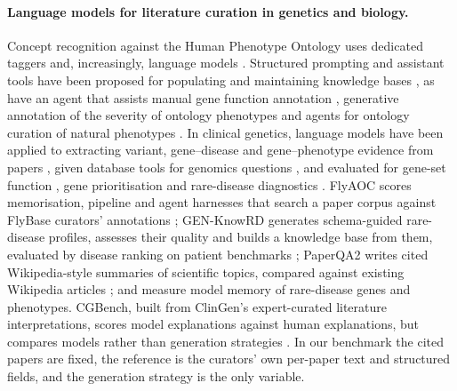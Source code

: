 \documentclass{article} %
\begin{document}
\paragraph{Language models for literature curation in genetics and biology.}
Concept recognition against the Human Phenotype Ontology uses dedicated taggers \citep{luo2021phenotagger,groza2024fasthpocr} and, increasingly, language models \citep{groza2024evaluation,yang2024enhancing,garcia2025improving}. Structured prompting and assistant tools have been proposed for populating and maintaining knowledge bases \citep{caufield2024structured,caufield2024curategpt,toro2024dynamic,niyonkuru2025leveraging}, as have an agent that assists manual gene function annotation \citep{Li2025GenewhispererEnhancing}, generative annotation of the severity of ontology phenotypes \citep{Murphy2024HarnessingGenerative} and agents for ontology curation of natural phenotypes \citep{balhoff2026frontier}. In clinical genetics, language models have been applied to extracting variant, gene--disease and gene--phenotype evidence from papers \citep{li2025autopm3,furlan2025eagleai,wang2026pubmind,yin2026benchmarking}, given database tools for genomics questions \citep{Jin2023GenegptAugmenting}, and evaluated for gene-set function \citep{hu2025evaluation}, gene prioritisation \citep{Kim2024AssessingUtility} and rare-disease diagnostics \citep{twede2026evidence}. FlyAOC scores memorisation, pipeline and agent harnesses that search a paper corpus against FlyBase curators' annotations \citep{zhang2026flyaoc}; GEN-KnowRD generates schema-guided rare-disease profiles, assesses their quality and builds a knowledge base from them, evaluated by disease ranking on patient benchmarks \citep{yan2026genknowrd}; PaperQA2 writes cited Wikipedia-style summaries of scientific topics, compared against existing Wikipedia articles \citep{skarlinski2024language}; and \citet{groza2026systematic} measure model memory of rare-disease genes and phenotypes. CGBench, built from ClinGen's expert-curated literature interpretations, scores model explanations against human explanations, but compares models rather than generation strategies \citep{queen2025cgbench}. In our benchmark the cited papers are fixed, the reference is the curators' own per-paper text and structured fields, and the generation strategy is the only variable.
\end{document}
